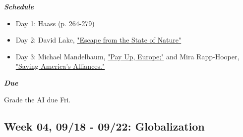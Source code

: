 \documentclass[11pt,]{article}
\begin{document}
\begin{multicols}{2}

\textbf{\textit{Schedule}}

\begin{itemize}

\item Day 1: Haass (p. 264-279)

\item Day 2: David Lake, \href{http://quote.ucsd.edu/lake/files/2018/07/Lake-IS-32-1.pdf}{"Escape from the State of Nature"}

\item Day 3: Michael Mandelbaum, \href{https://drive.google.com/file/d/1Eo1Y96gsgn6wLHh8HI4FNyPr-mUh481v/view?usp=sharing} {"Pay Up, Europe;"} and Mira Rapp-Hooper, \href{https://drive.google.com/file/d/1Xh4OhxpTK-Hbm80COYLnIH8h7x9AMvui/view?usp=sharing}{"Saving America's Alliances."}

\end{itemize}

\columnbreak

\begin{flushright}

\textbf{\textit{Due}}

Grade the AI due Fri.

\end{flushright}

\end{multicols}

\hypertarget{week-04-0918---0922-globalization}{%
\subsection{Week 04, 09/18 - 09/22:
Globalization}\label{week-04-0918---0922-globalization}}
\end{document}
